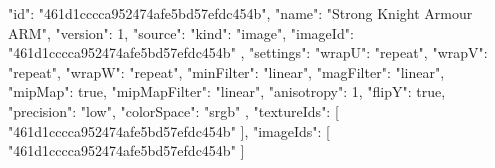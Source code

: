 {
  "id": "461d1cccca952474afe5bd57efdc454b",
  "name": "Strong Knight Armour ARM",
  "version": 1,
  "source": {
    "kind": "image",
    "imageId": "461d1cccca952474afe5bd57efdc454b"
  },
  "settings": {
    "wrapU": "repeat",
    "wrapV": "repeat",
    "wrapW": "repeat",
    "minFilter": "linear",
    "magFilter": "linear",
    "mipMap": true,
    "mipMapFilter": "linear",
    "anisotropy": 1,
    "flipY": true,
    "precision": "low",
    "colorSpace": "srgb"
  },
  "textureIds": [
    "461d1cccca952474afe5bd57efdc454b"
  ],
  "imageIds": [
    "461d1cccca952474afe5bd57efdc454b"
  ]
}
